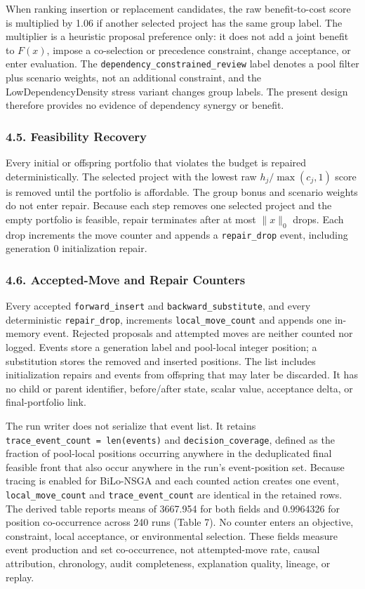 \documentclass[
]{article}
\begin{document}
When ranking insertion or replacement candidates, the raw benefit-to-cost score is multiplied by 1.06 if another selected project has the same group label. The multiplier is a heuristic proposal preference only: it does not add a joint benefit to \(F(x)\), impose a co-selection or precedence constraint, change acceptance, or enter evaluation. The \texttt{dependency\_constrained\_review} label denotes a pool filter plus scenario weights, not an additional constraint, and the LowDependencyDensity stress variant changes group labels. The present design therefore provides no evidence of dependency synergy or benefit.

\subsubsection{4.5. Feasibility Recovery}\label{feasibility-recovery}

Every initial or offspring portfolio that violates the budget is repaired deterministically. The selected project with the lowest raw \(h_j/\max(c_j,1)\) score is removed until the portfolio is affordable. The group bonus and scenario weights do not enter repair. Because each step removes one selected project and the empty portfolio is feasible, repair terminates after at most \(\|x\|_0\) drops. Each drop increments the move counter and appends a \texttt{repair\_drop} event, including generation 0 initialization repair.

\subsubsection{4.6. Accepted-Move and Repair Counters}\label{accepted-move-and-repair-counters}

Every accepted \texttt{forward\_insert} and \texttt{backward\_substitute}, and every deterministic \texttt{repair\_drop}, increments \texttt{local\_move\_count} and appends one in-memory event. Rejected proposals and attempted moves are neither counted nor logged. Events store a generation label and pool-local integer position; a substitution stores the removed and inserted positions. The list includes initialization repairs and events from offspring that may later be discarded. It has no child or parent identifier, before/after state, scalar value, acceptance delta, or final-portfolio link.

The run writer does not serialize that event list. It retains \texttt{trace\_event\_count\ =\ len(events)} and \texttt{decision\_coverage}, defined as the fraction of pool-local positions occurring anywhere in the deduplicated final feasible front that also occur anywhere in the run's event-position set. Because tracing is enabled for BiLo-NSGA and each counted action creates one event, \texttt{local\_move\_count} and \texttt{trace\_event\_count} are identical in the retained rows. The derived table reports means of 3667.954 for both fields and 0.9964326 for position co-occurrence across 240 runs (Table 7). No counter enters an objective, constraint, local acceptance, or environmental selection. These fields measure event production and set co-occurrence, not attempted-move rate, causal attribution, chronology, audit completeness, explanation quality, lineage, or replay.
\end{document}
